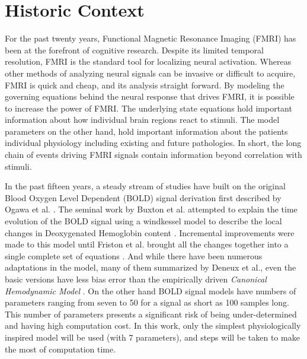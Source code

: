 \section{Historic Context}
For the past twenty years, Functional Magnetic Resonance Imaging (FMRI) 
has been at the forefront of cognitive research. Despite its
limited temporal resolution, FMRI is the standard tool for localizing 
neural activation.  Whereas other methods
of analyzing neural signals can be invasive or difficult to acquire, 
FMRI is quick and cheap, and its analysis straight forward.
By modeling the governing equations behind the neural response that
drives FMRI, it is possible to increase the power of FMRI.
The underlying state equations hold important information
about how individual brain regions react to stimuli. The model parameters
on the other hand, hold important information about the patients individual
physiology including existing and future pathologies. In short,
the long chain of events driving FMRI signals contain information 
beyond correlation with stimuli.

In the past fifteen years, a steady stream of studies have built
on the original Blood Oxygen Level Dependent (BOLD) signal 
derivation first described by Ogawa et al. \cite{Ogawa}.
The seminal work by Buxton et al. attempted to explain the
time evolution of the BOLD signal using a windkessel model to
describe the local changes in Deoxygenated Hemoglobin content \cite{Buxton1998}.
Incremental improvements were made to this model until Friston et al.
brought all the changes together into a single complete 
set of equations \cite{Friston2000}. And while there have been numerous adaptations in the model, 
many of them summarized by Deneux et al., even the basic versions
have less bias error than the empirically driven \emph{Canonical Hemodynamic Model}
\cite{Deneux2006,Handwerker2004}.
On the other hand BOLD signal models have numbers
of parameters ranging from seven \cite{Riera2004} to 50 \cite{Behzadi2005} 
for a signal as short as 100 samples long. This number of parameters presents
a significant risk of being under-determined and having high computation cost. 
In this work, only the simplest physiologically inspired model will be
used (with 7 parameters), and steps will be taken to make the most of computation
time.


